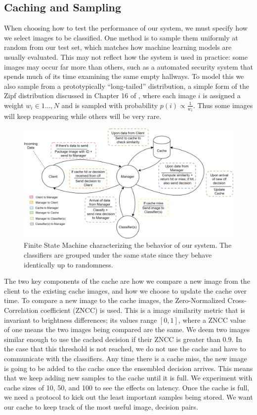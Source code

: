 \documentclass[12pt]{article}
\begin{document}
\subsection{Caching and Sampling}

When choosing how to test the performance of our system, we must specify how we select images to be classified.
One method is to sample them uniformly at random from our test set, which matches how machine learning models are usually evaluated.
This may not reflect how the system is used in practice: some images may occur far more than others, such as a automated security system that spends much of its time examining the same empty hallways.
To model this we also sample from a prototypically ``long-tailed'' distribution, a simple form of the Zipf distribution discussed in Chapter 16 of \cite{mitzenmacher}, where each image $i$ is assigned a weight $w_i\in 1\ldots, N$
    and is sampled with probability $p(i)\propto \frac{1}{w_i}$.
Thus some images will keep reappearing while others will be very rare.

\begin{figure}[t]
    \centering
    \includegraphics[scale=0.15]{FSM.png}
    \caption{Finite State Machine characterizing the behavior of our system. The classifiers are grouped under the same state since they behave identically up to randomness.}
    \label{fig:fsm}
\end{figure}

The two key components of the cache are how we compare a new image from the client to the existing cache images, and how we choose to update the cache over time. To compare a new image to the cache images, the Zero-Normalized Cross-Correlation coefficient (ZNCC) is used. This is a image similarity metric that is invariant to brightness differences; its values range $[0,1]$, where a ZNCC value of one means the two images being compared are the same. We deem two images similar enough to use the cached decision if their ZNCC is greater than $0.9$. In the case that this threshold is not reached, we do not use the cache and have to communicate with the classifiers. Any time there is a cache miss, the new image is going to be added to the cache once the ensembled decision arrives. This means that we keep adding new samples to the cache until it is full. We experiment with cache sizes of 10, 50, and 100 to see the effects on latency. Once the cache is full, we need a protocol to kick out the least important samples being stored. We want our cache to keep track of the most useful image, decision pairs. 
\end{document}
